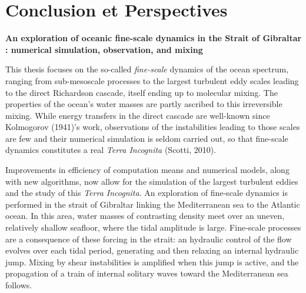 \documentclass[a4paper,12pt,notitlepage,twoside]{report}
\numberwithin{equation}{section}
\begin{document}



\chapter{Conclusion et Perspectives}


\listoffigures

\listoftables





\newpage
\thispagestyle{empty}
\begin{center}
\textbf{An exploration of oceanic fine-scale dynamics in the Strait of Gibraltar : numerical simulation, observation, and mixing}
\end{center}
This thesis focuses on the so-called \textit{fine-scale} dynamics of the ocean spectrum, ranging from sub-mesoscale processes to the largest turbulent eddy scales leading to the direct Richardson cascade, itself ending up to molecular mixing. The properties of the ocean's water masses are partly ascribed to this irreversible mixing. While energy transfers in the direct cascade are well-known since Kolmogorov (1941)'s work, observations of the instabilities leading to those scales are few and their numerical simulation is seldom carried out, so that fine-scale dynamics constitutes a real \textit{Terra Incognita} (Scotti, 2010).

Improvements in efficiency of computation means and numerical models, along with new algorithms, now allow for the simulation of the largest turbulent eddies and the study of this \textit{Terra Incognita}. An exploration of fine-scale dynamics is performed in the strait of Gibraltar linking the Mediterranean sea to the Atlantic ocean. In this area, water masses of contrasting density meet over an uneven, relatively shallow seafloor, where the tidal amplitude is large. Fine-scale processes are a consequence of these forcing in the strait: an hydraulic control of the flow evolves over each tidal period, generating and then relaxing an internal hydraulic jump. Mixing by shear instabilities is amplified when this jump is active, and the propagation of a train of internal solitary waves toward the Mediterranean sea follows.
\end{document}
